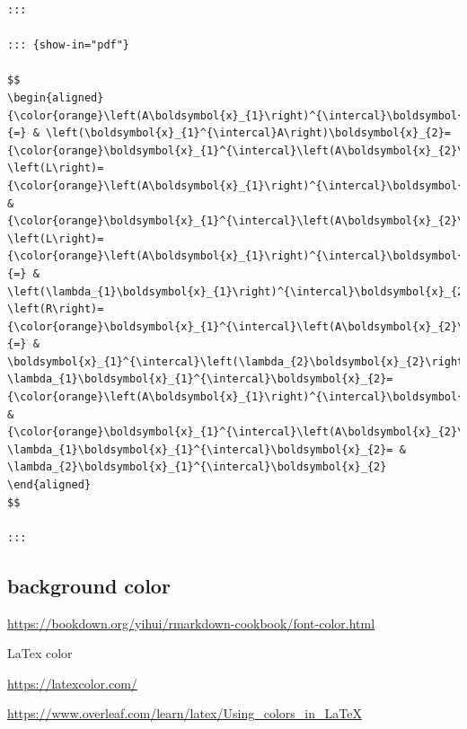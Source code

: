 \documentclass[
]{book}
\theoremstyle{definition}
\theoremstyle{definition}
\theoremstyle{definition}
\theoremstyle{definition}
\theoremstyle{remark}
\begin{document}
\begin{verbatim}
:::

::: {show-in="pdf"}

$$
\begin{aligned}
{\color{orange}\left(A\boldsymbol{x}_{1}\right)^{\intercal}\boldsymbol{x}_{2}}=\left(\boldsymbol{x}_{1}^{\intercal}A^{\intercal}\right)\boldsymbol{x}_{2}\overset{\text{symmetric}}{=} & \left(\boldsymbol{x}_{1}^{\intercal}A\right)\boldsymbol{x}_{2}={\color{orange}\boldsymbol{x}_{1}^{\intercal}\left(A\boldsymbol{x}_{2}\right)}\\
\left(L\right)={\color{orange}\left(A\boldsymbol{x}_{1}\right)^{\intercal}\boldsymbol{x}_{2}=} & {\color{orange}\boldsymbol{x}_{1}^{\intercal}\left(A\boldsymbol{x}_{2}\right)}=\left(R\right)\\
\left(L\right)={\color{orange}\left(A\boldsymbol{x}_{1}\right)^{\intercal}\boldsymbol{x}_{2}}\overset{\left(e_{1}\right)}{=} & \left(\lambda_{1}\boldsymbol{x}_{1}\right)^{\intercal}\boldsymbol{x}_{2}=\lambda_{1}\boldsymbol{x}_{1}^{\intercal}\boldsymbol{x}_{2}\\
\left(R\right)={\color{orange}\boldsymbol{x}_{1}^{\intercal}\left(A\boldsymbol{x}_{2}\right)}\overset{\left(e_{2}\right)}{=} & \boldsymbol{x}_{1}^{\intercal}\left(\lambda_{2}\boldsymbol{x}_{2}\right)=\lambda_{2}\boldsymbol{x}_{1}^{\intercal}\boldsymbol{x}_{2}\\
\lambda_{1}\boldsymbol{x}_{1}^{\intercal}\boldsymbol{x}_{2}={\color{orange}\left(A\boldsymbol{x}_{1}\right)^{\intercal}\boldsymbol{x}_{2}=} & {\color{orange}\boldsymbol{x}_{1}^{\intercal}\left(A\boldsymbol{x}_{2}\right)}=\lambda_{2}\boldsymbol{x}_{1}^{\intercal}\boldsymbol{x}_{2}\\
\lambda_{1}\boldsymbol{x}_{1}^{\intercal}\boldsymbol{x}_{2}= & \lambda_{2}\boldsymbol{x}_{1}^{\intercal}\boldsymbol{x}_{2}
\end{aligned}
$$

:::
\end{verbatim}

\hypertarget{background-color}{%
\subsection{background color}\label{background-color}}

\url{https://bookdown.org/yihui/rmarkdown-cookbook/font-color.html}

LaTex color

\url{https://latexcolor.com/}

\url{https://www.overleaf.com/learn/latex/Using_colors_in_LaTeX}
\end{document}
